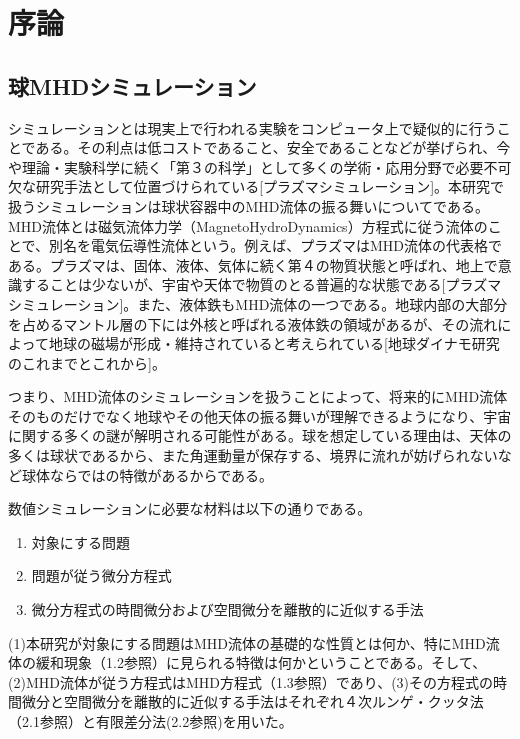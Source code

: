 \documentclass[12pt]{jsarticle}
\begin{document}
\newpage
\thispagestyle{empty}
\setcounter{tocdepth}{2}
\tableofcontents
\newpage
\setcounter{page}{1}
\section{序論}
\subsection{球MHDシミュレーション}
シミュレーションとは現実上で行われる実験をコンピュータ上で疑似的に行うことである。その利点は低コストであること、安全であることなどが挙げられ、今や理論・実験科学に続く「第３の科学」として多くの学術・応用分野で必要不可欠な研究手法として位置づけられている[プラズマシミュレーション]。本研究で扱うシミュレーションは球状容器中のMHD流体の振る舞いについてである。MHD流体とは磁気流体力学（MagnetoHydroDynamics）方程式に従う流体のことで、別名を電気伝導性流体という。例えば、プラズマはMHD流体の代表格である。プラズマは、固体、液体、気体に続く第４の物質状態と呼ばれ、地上で意識することは少ないが、宇宙や天体で物質のとる普遍的な状態である[プラズマシミュレーション]。また、液体鉄もMHD流体の一つである。地球内部の大部分を占めるマントル層の下には外核と呼ばれる液体鉄の領域があるが、その流れによって地球の磁場が形成・維持されていると考えられている[地球ダイナモ研究のこれまでとこれから]。

つまり、MHD流体のシミュレーションを扱うことによって、将来的にMHD流体そのものだけでなく地球やその他天体の振る舞いが理解できるようになり、宇宙に関する多くの謎が解明される可能性がある。球を想定している理由は、天体の多くは球状であるから、また角運動量が保存する、境界に流れが妨げられないなど球体ならではの特徴があるからである。

数値シミュレーションに必要な材料は以下の通りである。
\begin{enumerate}
  \renewcommand{\labelenumi}{(\arabic{enumi})}
  \item 対象にする問題
  \item 問題が従う微分方程式
  \item 微分方程式の時間微分および空間微分を離散的に近似する手法
\end{enumerate}
(1)本研究が対象にする問題はMHD流体の基礎的な性質とは何か、特にMHD流体の緩和現象（1.2参照）に見られる特徴は何かということである。そして、(2)MHD流体が従う方程式はMHD方程式（1.3参照）であり、(3)その方程式の時間微分と空間微分を離散的に近似する手法はそれぞれ４次ルンゲ・クッタ法（2.1参照）と有限差分法(2.2参照)を用いた。
\end{document}
